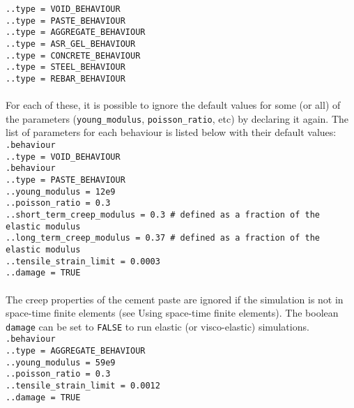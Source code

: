 \documentclass[10pt]{article}
\begin{document}
\noindent \verb+..type = VOID_BEHAVIOUR+\\
\verb+..type = PASTE_BEHAVIOUR+\\
\verb+..type = AGGREGATE_BEHAVIOUR+\\
\verb+..type = ASR_GEL_BEHAVIOUR+\\
\verb+..type = CONCRETE_BEHAVIOUR+\\
\verb+..type = STEEL_BEHAVIOUR+\\
\verb+..type = REBAR_BEHAVIOUR+

\paragraph{}For each of these, it is possible to ignore the default values for some (or all) of the parameters (\verb+young_modulus+, \verb+poisson_ratio+, etc) by declaring it again. The list of parameters for each behaviour is listed below with their default values:\\

\noindent \verb+.behaviour+\\
\verb+..type = VOID_BEHAVIOUR+\\

\noindent \verb+.behaviour+\\
\verb+..type = PASTE_BEHAVIOUR+\\
\verb+..young_modulus = 12e9+\\
\verb+..poisson_ratio = 0.3+\\
\verb+..short_term_creep_modulus = 0.3 # defined as a fraction of the elastic modulus+\\
\verb+..long_term_creep_modulus = 0.37 # defined as a fraction of the elastic modulus+\\
\verb+..tensile_strain_limit = 0.0003+\\
\verb+..damage = TRUE+

\paragraph{} The creep properties of the cement paste are ignored if the simulation is not in space-time finite elements (see Using space-time finite elements). The boolean \verb+damage+ can be set to \verb+FALSE+ to run elastic (or visco-elastic) simulations.\\

\noindent \verb+.behaviour+\\
\verb+..type = AGGREGATE_BEHAVIOUR+\\
\verb+..young_modulus = 59e9+\\
\verb+..poisson_ratio = 0.3+\\
\verb+..tensile_strain_limit = 0.0012+\\
\verb+..damage = TRUE+\\
\end{document}
